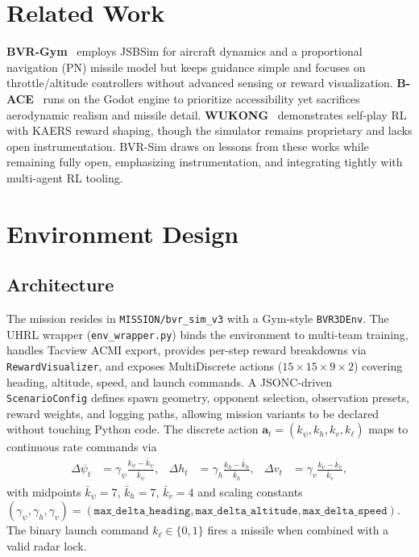 \documentclass[11pt]{article}
\begin{document}
\section{Related Work}
\textbf{BVR-Gym}~\cite{scukins2024bvrgym} employs JSBSim for aircraft dynamics and a proportional navigation (PN) missile model but keeps guidance simple and focuses on throttle/altitude controllers without advanced sensing or reward visualization. \textbf{B-ACE}~\cite{kuroswiski2024bace} runs on the Godot engine to prioritize accessibility yet sacrifices aerodynamic realism and missile detail. \textbf{WUKONG}~\cite{piao2020wukong} demonstrates self-play RL with KAERS reward shaping, though the simulator remains proprietary and lacks open instrumentation. BVR-Sim draws on lessons from these works while remaining fully open, emphasizing instrumentation, and integrating tightly with multi-agent RL tooling.

\section{Environment Design}
\subsection{Architecture}
The mission resides in \texttt{MISSION/bvr\_sim\_v3} with a Gym-style \texttt{BVR3DEnv}. The UHRL wrapper (\texttt{env\_wrapper.py}) binds the environment to multi-team training, handles Tacview ACMI export, provides per-step reward breakdowns via \texttt{RewardVisualizer}, and exposes MultiDiscrete actions ($15\!\times\!15\!\times\!9\!\times\!2$) covering heading, altitude, speed, and launch commands. A JSONC-driven \texttt{ScenarioConfig} defines spawn geometry, opponent selection, observation presets, reward weights, and logging paths, allowing mission variants to be declared without touching Python code. The discrete action $\mathbf{a}_t=(k_\psi,k_h,k_v,k_\ell)$ maps to continuous rate commands via
\begin{align}
\Delta \psi_t &= \gamma_\psi \frac{k_\psi-\bar{k}_\psi}{\bar{k}_\psi},&
\Delta h_t &= \gamma_h \frac{k_h-\bar{k}_h}{\bar{k}_h},&
\Delta v_t &= \gamma_v \frac{k_v-\bar{k}_v}{\bar{k}_v}, \label{eq:action_map}
\end{align}
with midpoints $\bar{k}_\psi=7$, $\bar{k}_h=7$, $\bar{k}_v=4$ and scaling constants $(\gamma_\psi,\gamma_h,\gamma_v)=(\texttt{max\_delta\_heading},\texttt{max\_delta\_altitude},\texttt{max\_delta\_speed})$. The binary launch command $k_\ell\in\{0,1\}$ fires a missile when combined with a valid radar lock.
\end{document}
